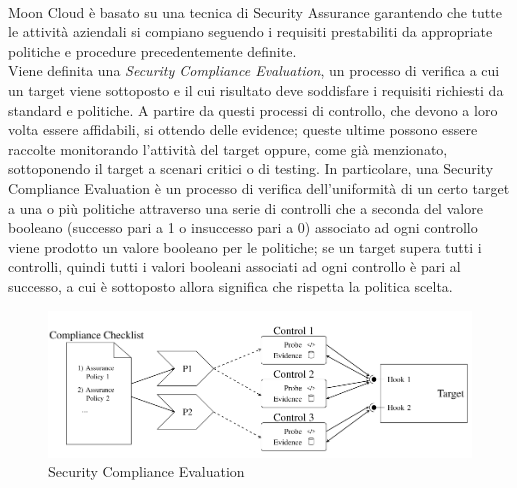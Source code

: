 \ \\
Moon Cloud è basato su una tecnica di Security Assurance garantendo che tutte le attività aziendali si compiano seguendo i requisiti 
prestabiliti da appropriate politiche e procedure precedentemente definite.\\
Viene definita una \textit{Security Compliance Evaluation}, un processo di verifica a cui un target viene sottoposto e il cui risultato 
deve soddisfare i requisiti richiesti da standard e politiche. A partire da questi processi di controllo, che devono a loro volta essere 
affidabili, si ottendo delle evidence; queste ultime possono essere raccolte monitorando l'attività del target oppure, come già 
menzionato, sottoponendo il target a scenari critici o di testing.
In particolare, una Security Compliance Evaluation è un processo di verifica dell'uniformità di un certo target a una o più politiche 
attraverso una serie di controlli che a seconda del valore booleano (successo pari a 1 o insuccesso pari a 0) associato ad ogni controllo viene prodotto 
un valore booleano per le politiche; se un target supera tutti i controlli, quindi tutti i valori booleani associati ad ogni controllo
è pari al successo, a cui è sottoposto allora significa che rispetta la politica scelta. 

\begin{figure}[ht!]
	\includegraphics[scale=0.5]{images/Security_Compliance_Evaluation.png}
	\caption{Security Compliance Evaluation}
	\label{fig:Security_Compliance_Evaluation}
\end{figure}

